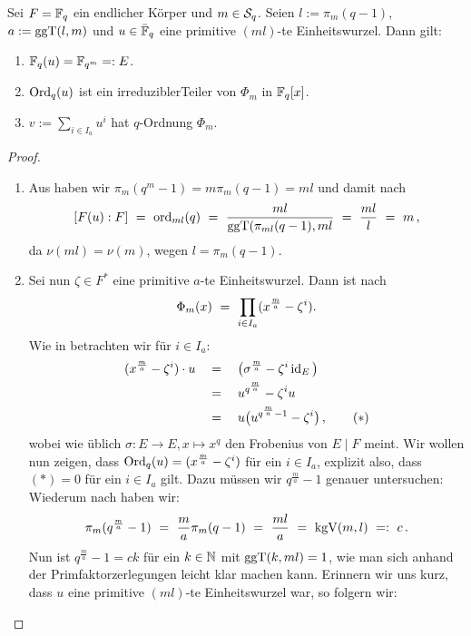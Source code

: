 \begin{satz}
  \label{satz:konstruktion_q_ordnung}
  Sei $F = \F_q$ ein endlicher Körper und $m \in \S_q$. Seien
  $l := \pi_m(q-1)$, $a := \ggT(l,m)$ und $u \in \bar\F_q$ eine primitive
  $(ml)$-te Einheitswurzel. Dann gilt:
  \begin{enumerate}
    \item $\F_q(u) = \F_{q^m} =: E$.
    \item $\Ord_q(u)$ ist ein irreduziblerTeiler von $\Phi_m$ in $\F_q[x]$.
    \item $v := \sum_{i \in I_a} u^i$ hat $q$-Ordnung $\Phi_m$.
  \end{enumerate}
\end{satz}
\begin{proof}
  \begin{enumerate}
  \item Aus  haben wir 
   $\pi_m(q^m-1) = m\pi_m(q-1) = ml$ und
    damit nach  
    \[ [F(u):F] \speq= \ord_{ml}(q) \speq= 
      \frac{ml}{\ggT(\pi_{ml}(q-1), ml} \speq=
      \frac{ml}{l} \speq= m\,,\]
    da $\nu(ml) = \nu(m)$, wegen $l = \pi_m(q-1)$.
  \item Sei nun $\zeta \in F^\ast$ eine primitive $a$-te Einheitswurzel. Dann
    ist nach 
    \[ \Phi_m(x) \speq= \prod_{i\in I_a} (x^{\frac m a} - \zeta^i).\]
    Wie in  betrachten wir für $i \in I_a$:
    \begin{align*}
      (x^{\frac m a} - \zeta^i)\cdot u 
      \quad&=\quad \big( \sigma^{\frac m a} - \zeta^i \id_E \big)\\
        &=\quad u^{q^{\frac m a}} - \zeta^i u \\
        &=\quad u\big( u^{q^{\frac m a}-1} - \zeta^i \big)\,, \tag{$\ast$}
    \end{align*}
    wobei wie üblich $\sigma: E \to E, x \mapsto x^q$ den Frobenius von
    $E\mid F$ meint. Wir wollen nun zeigen, dass $\Ord_q(u) = (x^{\frac m a} -
    \zeta^i)$ für ein $i\in I_a$, explizit also, dass $(\ast) = 0$ für ein
    $i\in I_a$ gilt. Dazu müssen wir $q^{\frac m a} -1$ genauer untersuchen:
    Wiederum nach  haben wir:
    \[ \pi_m(q^{\frac m a} -1 ) \speq= \frac m a \pi_m(q-1) \speq=
      \frac{ml}{a} \speq= \kgV(m,l) \speq{=:} c\,.\]
    Nun ist $q^{\frac m a}-1 = ck$ für 
    ein $k\in\N$ mit $\ggT(k,ml) = 1$, wie man sich anhand der 
    Primfaktorzerlegungen leicht klar machen kann. Erinnern wir uns kurz, 
    dass $u$ eine primitive $(ml)$-te Einheitswurzel war, so folgern wir:

\end{enumerate}
\end{proof}
